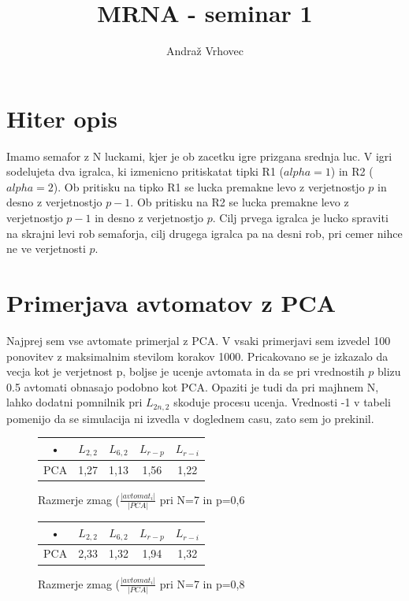 \documentclass[10pt,a4paper]{report}
\author{Andraž Vrhovec}
\title{MRNA - seminar 1}
\begin{document}
\maketitle

\section{Hiter opis}

Imamo semafor z N luckami, kjer je ob zacetku igre prizgana srednja luc. V igri sodelujeta dva igralca, ki izmenicno pritiskatat tipki R1 ($alpha=1$) in R2 ($alpha=2$). Ob pritisku na tipko R1 se lucka premakne levo z verjetnostjo $p$ in desno z verjetnostjo $p-1$. Ob pritisku na R2 se lucka premakne levo z verjetnostjo $p-1$ in desno z verjetnostjo $p$. Cilj prvega igralca je lucko spraviti na skrajni levi rob semaforja, cilj drugega igralca pa na desni rob, pri cemer nihce ne ve verjetnosti $p$.

\section{Primerjava avtomatov z PCA}

Najprej sem vse avtomate primerjal z PCA. V vsaki primerjavi sem izvedel 100 ponovitev z maksimalnim stevilom korakov 1000. Pricakovano se je izkazalo da vecja kot je verjetnost p, boljse je ucenje avtomata in da se pri vrednostih $p$ blizu 0.5 avtomati obnasajo podobno kot PCA. Opaziti je tudi da pri majhnem N, lahko dodatni pomnilnik pri $L_{2n,2}$ skoduje procesu ucenja. Vrednosti -1 v tabeli pomenijo da se simulacija ni izvedla v doglednem casu, zato sem jo prekinil.


\begin{figure}[h!]
\begin{center}
\begin{tabular}{|c|c|c|c|c|}
\hline • & $L_{2,2}$ & $L_{6,2}$ & $L_{r-p}$ & $L_{r-i}$ \\ 
\hline PCA & 1,27 & 1,13 & 1,56 & 1,22 \\ 
\hline 
\end{tabular} 
\end{center}
\caption{Razmerje zmag ($\frac{|avtomat_i|}{|PCA|}$ pri N=7 in p=0,6}
\end{figure}

\begin{figure}[h!]
\begin{center}
\begin{tabular}{|c|c|c|c|c|}
\hline • & $L_{2,2}$ & $L_{6,2}$ & $L_{r-p}$ & $L_{r-i}$ \\ 
\hline PCA & 2,33 & 1,32 & 1,94 & 1,32 \\ 
\hline 
\end{tabular} 
\end{center}
\caption{Razmerje zmag ($\frac{|avtomat_i|}{|PCA|}$ pri N=7 in p=0,8}
\end{figure}
\end{document}
